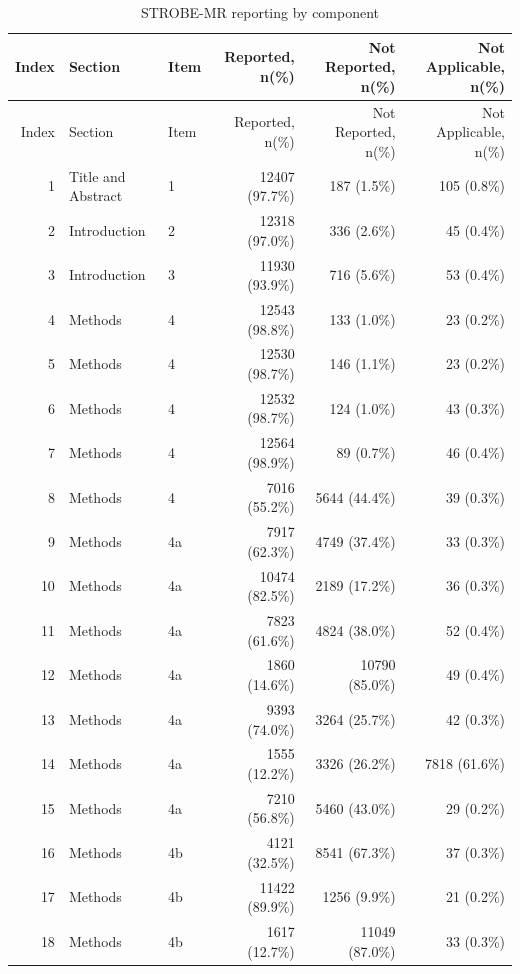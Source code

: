 \begin{longtable}{@{}rllrrr@{}}
\caption{STROBE-MR reporting by component}
\label{tab:report:component} \\

\toprule
Index & Section & Item & Reported, n(\%) & Not Reported, n(\%) & Not Applicable, n(\%) \\
\midrule
\endfirsthead

\toprule
Index & Section & Item & Reported, n(\%) & Not Reported, n(\%) & Not Applicable, n(\%) \\
\midrule
\endhead

\bottomrule
\endfoot

1 & Title and Abstract & 1 & 12407 (97.7\%) & 187 (1.5\%) & 105 (0.8\%) \\
2 & Introduction & 2 & 12318 (97.0\%) & 336 (2.6\%) & 45 (0.4\%) \\
3 & Introduction & 3 & 11930 (93.9\%) & 716 (5.6\%) & 53 (0.4\%) \\
4 & Methods & 4 & 12543 (98.8\%) & 133 (1.0\%) & 23 (0.2\%) \\
5 & Methods & 4 & 12530 (98.7\%) & 146 (1.1\%) & 23 (0.2\%) \\
6 & Methods & 4 & 12532 (98.7\%) & 124 (1.0\%) & 43 (0.3\%) \\
7 & Methods & 4 & 12564 (98.9\%) & 89 (0.7\%) & 46 (0.4\%) \\
8 & Methods & 4 & 7016 (55.2\%) & 5644 (44.4\%) & 39 (0.3\%) \\
9 & Methods & 4a & 7917 (62.3\%) & 4749 (37.4\%) & 33 (0.3\%) \\
10 & Methods & 4a & 10474 (82.5\%) & 2189 (17.2\%) & 36 (0.3\%) \\
11 & Methods & 4a & 7823 (61.6\%) & 4824 (38.0\%) & 52 (0.4\%) \\
12 & Methods & 4a & 1860 (14.6\%) & 10790 (85.0\%) & 49 (0.4\%) \\
13 & Methods & 4a & 9393 (74.0\%) & 3264 (25.7\%) & 42 (0.3\%) \\
14 & Methods & 4a & 1555 (12.2\%) & 3326 (26.2\%) & 7818 (61.6\%) \\
15 & Methods & 4a & 7210 (56.8\%) & 5460 (43.0\%) & 29 (0.2\%) \\
16 & Methods & 4b & 4121 (32.5\%) & 8541 (67.3\%) & 37 (0.3\%) \\
17 & Methods & 4b & 11422 (89.9\%) & 1256 (9.9\%) & 21 (0.2\%) \\
18 & Methods & 4b & 1617 (12.7\%) & 11049 (87.0\%) & 33 (0.3\%) \\

\end{longtable}
